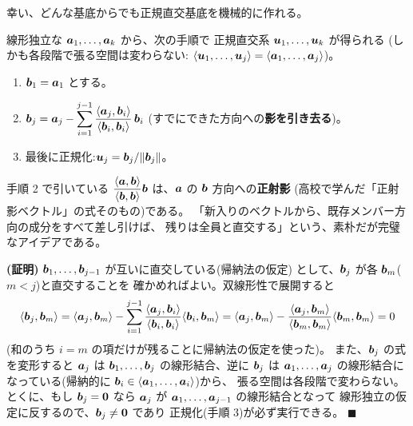 幸い、どんな基底からでも正規直交基底を機械的に作れる。

\begin{teiri}\label{thm:gs-main}
線形独立な $\bm{a}_1, \dots, \bm{a}_k$ から、次の手順で
正規直交系 $\bm{u}_1, \dots, \bm{u}_k$ が得られる
(しかも各段階で張る空間は変わらない:
$\langle \bm{u}_1, \dots, \bm{u}_j \rangle
= \langle \bm{a}_1, \dots, \bm{a}_j \rangle$)。
\begin{enumerate}
\item $\bm{b}_1 = \bm{a}_1$ とする。
\item $\bm{b}_j = \bm{a}_j - \displaystyle\sum_{i=1}^{j-1}
\frac{\langle \bm{a}_j, \bm{b}_i \rangle}{\langle \bm{b}_i, \bm{b}_i \rangle}\,
\bm{b}_i$
(すでにできた方向への\textbf{影を引き去る})。
\item 最後に正規化:$\bm{u}_j = \bm{b}_j / \|\bm{b}_j\|$。
\end{enumerate}
\end{teiri}

手順 2 で引いている
$\dfrac{\langle \bm{a}, \bm{b} \rangle}{\langle \bm{b}, \bm{b} \rangle}\bm{b}$
は、$\bm{a}$ の $\bm{b}$ 方向への\textbf{正射影}
(高校で学んだ「正射影ベクトル」の式そのもの)である。
「新入りのベクトルから、既存メンバー方向の成分をすべて差し引けば、
残りは全員と直交する」という、素朴だが完璧なアイデアである。

\noindent\textbf{(証明)}\quad
$\bm{b}_1, \dots, \bm{b}_{j-1}$ が互いに直交している(帰納法の仮定)
として、$\bm{b}_j$ が各 $\bm{b}_m$($m < j$)と直交することを
確かめればよい。双線形性で展開すると
\[
\langle \bm{b}_j, \bm{b}_m \rangle
= \langle \bm{a}_j, \bm{b}_m \rangle - \sum_{i=1}^{j-1}
\frac{\langle \bm{a}_j, \bm{b}_i \rangle}{\langle \bm{b}_i, \bm{b}_i \rangle}
\langle \bm{b}_i, \bm{b}_m \rangle
= \langle \bm{a}_j, \bm{b}_m \rangle
- \frac{\langle \bm{a}_j, \bm{b}_m \rangle}{\langle \bm{b}_m, \bm{b}_m \rangle}
\langle \bm{b}_m, \bm{b}_m \rangle = 0
\]
(和のうち $i = m$ の項だけが残ることに帰納法の仮定を使った)。
また、$\bm{b}_j$ の式を変形すると $\bm{a}_j$ は
$\bm{b}_1, \dots, \bm{b}_j$ の線形結合、逆に $\bm{b}_j$ は
$\bm{a}_1, \dots, \bm{a}_j$ の線形結合になっている(帰納的に
$\bm{b}_i \in \langle \bm{a}_1, \dots, \bm{a}_i \rangle$)から、
張る空間は各段階で変わらない。とくに、もし $\bm{b}_j = \bm{0}$ なら
$\bm{a}_j$ が $\bm{a}_1, \dots, \bm{a}_{j-1}$ の線形結合となって
線形独立の仮定に反するので、$\bm{b}_j \neq \bm{0}$ であり
正規化(手順 3)が必ず実行できる。 $\blacksquare$

